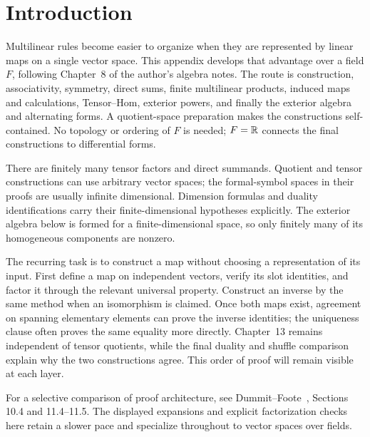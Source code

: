 \label{app:tensors}
\section*{Introduction}
Multilinear rules become easier to organize when they are represented by
linear maps on a single vector space. This appendix develops that advantage
over a field $F$, following Chapter~8 of the author's algebra notes.
The route is construction,
associativity, symmetry, direct sums, finite multilinear products, induced
maps and calculations, Tensor--Hom, exterior powers, and finally the
exterior algebra and alternating forms. A quotient-space preparation makes
the constructions self-contained. No topology or ordering of $F$ is needed;
$F=\mathbb{R}$ connects the final constructions to differential forms.

There are finitely many tensor factors and direct summands. Quotient and
tensor constructions can use arbitrary vector spaces; the formal-symbol
spaces in their proofs are usually infinite dimensional. Dimension formulas
and duality identifications carry their finite-dimensional hypotheses explicitly.
The exterior algebra below is formed for a finite-dimensional space, so
only finitely many of its homogeneous components are nonzero.

The recurring task is to construct a map without choosing a representation
of its input. First define a map on independent vectors, verify its slot
identities, and factor it through the relevant universal property. Construct
an inverse by the same method when an isomorphism is claimed. Once both maps
exist, agreement on spanning elementary elements can prove the
inverse identities; the uniqueness clause often proves the same equality
more directly. Chapter~13 remains independent of tensor quotients, while
the final duality and shuffle comparison explain why the two constructions
agree. This order of proof will remain visible at each layer.

For a selective comparison of proof architecture, see
Dummit--Foote~\cite{dummit-foote}, Sections 10.4 and 11.4--11.5.
The displayed expansions and explicit factorization checks here retain
a slower pace and specialize throughout to vector spaces over fields.


